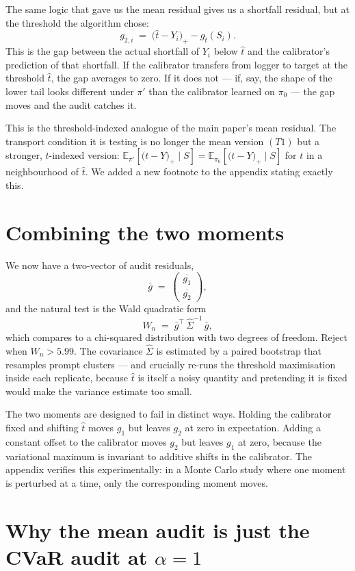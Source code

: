 \documentclass[11pt]{article}
\newcommand{\E}{\mathbb{E}}
\newcommand{\pzero}{\pi_{0}}
\newcommand{\pprime}{\pi'}
\newcommand{\sloss}[2]{\bigl(#1 - #2\bigr)_{+}}
\newcommand{\that}{\hat t}
\begin{document}
The same logic that gave us the mean residual gives us a shortfall residual, but at the threshold the algorithm chose:
\[
g_{2,i} \;=\; \sloss{\that}{Y_i} - g_{\that}(S_i).
\]
This is the gap between the actual shortfall of $Y_i$ below $\that$ and the calibrator's prediction of that shortfall. If the calibrator transfers from logger to target at the threshold $\that$, the gap averages to zero. If it does not --- if, say, the shape of the lower tail looks different under $\pprime$ than the calibrator learned on $\pzero$ --- the gap moves and the audit catches it.

This is the threshold-indexed analogue of the main paper's mean residual. The transport condition it is testing is no longer the mean version $(T1)$ but a stronger, $t$-indexed version: $\E_{\pprime}\!\left[\sloss{t}{Y} \mid S\right] = \E_{\pzero}\!\left[\sloss{t}{Y} \mid S\right]$ for $t$ in a neighbourhood of $\that$. We added a new footnote to the appendix stating exactly this.

\section*{Combining the two moments}

We now have a two-vector of audit residuals,
\[
\bar g \;=\; \begin{pmatrix} \overline{g_{1}} \\ \overline{g_{2}} \end{pmatrix},
\]
and the natural test is the Wald quadratic form
\[
W_n \;=\; \bar g^{\top}\, \hat\Sigma^{-1}\, \bar g,
\]
which compares to a chi-squared distribution with two degrees of freedom. Reject when $W_n > 5.99$. The covariance $\hat\Sigma$ is estimated by a paired bootstrap that resamples prompt clusters --- and crucially re-runs the threshold maximisation inside each replicate, because $\that$ is itself a noisy quantity and pretending it is fixed would make the variance estimate too small.

The two moments are designed to fail in distinct ways. Holding the calibrator fixed and shifting $\that$ moves $g_1$ but leaves $g_2$ at zero in expectation. Adding a constant offset to the calibrator moves $g_2$ but leaves $g_1$ at zero, because the variational maximum is invariant to additive shifts in the calibrator. The appendix verifies this experimentally: in a Monte Carlo study where one moment is perturbed at a time, only the corresponding moment moves.

\section*{Why the mean audit is just the CVaR audit at $\alpha = 1$}
\end{document}
